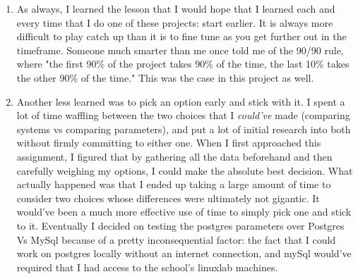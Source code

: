 \documentclass[11pt,letterpaper]{article}
\begin{document}
\begin{enumerate}
\begin{enumerate}
	\item As always, I learned the lesson that I would hope that I learned each and every time that I do one of these projects: start earlier.  It is always more difficult to play catch up than it is to fine tune as you get further out in the timeframe.  Someone much smarter than me once told me of the 90/90 rule, where "the first 90\% of the project takes 90\% of the time, the last 10\% takes the other 90\% of the time."  This was the case in this project as well.
	
	\item Another less learned was to pick an option early and stick with it.  I spent a lot of time waffling between the two choices that I \textit{could've} made (comparing systems vs comparing parameters), and put a lot of initial research into both without firmly committing to either one.  When I first approached this assignment, I figured that by gathering all the data beforehand and then carefully weighing my options, I could make the absolute best decision.  What actually happened was that I ended up taking a large amount of time to consider two choices whose differences were ultimately not gigantic.  It would've been a much more effective use of time to simply pick one and stick to it.  Eventually I decided on testing the postgres parameters over Postgres Vs MySql because of a pretty inconsequential factor: the fact that I could work on postgres locally without an internet connection, and mySql would've required that I had access to the school's linuxlab machines.
	
	\end{enumerate}
	
\end{enumerate}	
\end{document}
